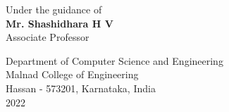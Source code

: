 \begin{titlepage}
\begin{center}
\vspace{0.5cm}
Under the guidance of\\
{\textbf{Mr. Shashidhara H V}}\\
Associate Professor\\

\vspace{.2in}


\Large{Department of Computer Science and Engineering}\\
\Large{Malnad College of Engineering}\\
\normalsize
Hassan - 573201, Karnataka, India\\
\vspace{0.2cm}
2022

\end{center}

\end{titlepage}